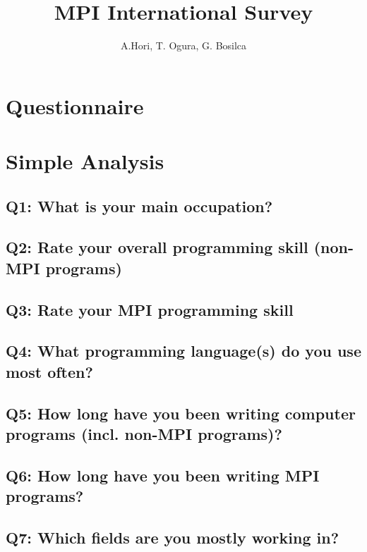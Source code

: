 \documentclass{report}
\title{MPI International Survey}
\author{A.Hori, T. Ogura, G. Bosilca}
\begin{document}
\maketitle

\todototoc
\listoftodos

\tableofcontents
\newpage

\chapter{Questionnaire}


\chapter{Simple Analysis}
\section{Q1: What is your main occupation?}


\clearpage
\section{Q2: Rate your overall programming skill (non-MPI programs)}


\clearpage
\section{Q3: Rate your MPI programming skill}


\clearpage
\section{Q4: What programming language(s) do you use most often?}


\clearpage
\section{Q5: How long have you been writing computer programs (incl. non-MPI programs)?}


\clearpage
\section{Q6: How long have you been writing MPI programs?}


\clearpage
\section{Q7: Which fields are you mostly working in?}

\end{document}
